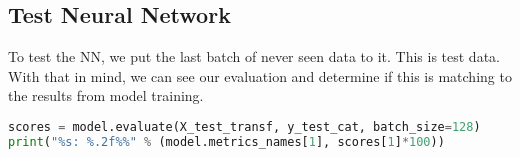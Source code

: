 \subsection{Test Neural Network}
To test the NN, we put the last batch of never seen data to it. This is test data. With that in mind, we can see our evaluation and determine if this is matching to the results from model training.
\begin{lstlisting}[language=Python, caption=Evaluate the model]
scores = model.evaluate(X_test_transf, y_test_cat, batch_size=128)
print("%s: %.2f%%" % (model.metrics_names[1], scores[1]*100))
\end{lstlisting}